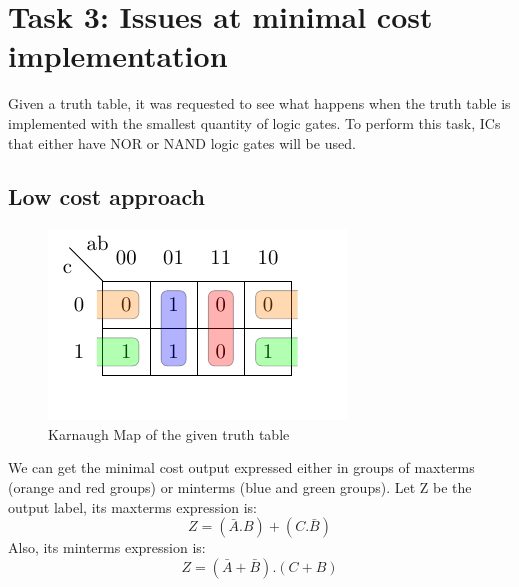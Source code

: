 \documentclass[a4paper,12pt]{article}
\begin{document}
\section*{Task 3: Issues at minimal cost implementation}

Given a truth table, it was requested to see what happens
when the truth table is implemented with the smallest quantity of logic
gates. To perform this task, ICs that either have NOR 
or NAND logic gates will be used.

\subsection*{Low cost approach}
\begin{figure}[htbp]
    \begin{center}
    \includegraphics{karnaugh_test.pdf}
    \end{center}
    \caption{Karnaugh   Map of the given truth table}
    \end{figure} 
We can get the minimal cost output expressed either in groups of 
maxterms (orange and red groups) or minterms (blue and green groups).
\linebreak
Let Z be the output label, its maxterms expression is:
\begin{equation}
    Z= (\bar{A}.B)+(C.\bar{B})
\end{equation} 
Also, its minterms expression is:
\begin{equation}
    Z= (\bar{A}+\bar{B}).(C+B)
\end{equation} 
\end{document}

